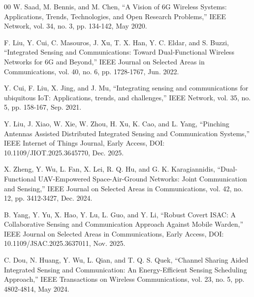 \documentclass[10pt,journal,compsoc]{IEEEtran}
\begin{document}
\begin{thebibliography}{00}
W. Saad, M. Bennis, and M. Chen, ``A Vision of 6G Wireless Systems: Applications, Trends, Technologies, and Open Research Problems,'' IEEE Network, vol. 34, no. 3, pp. 134-142, May 2020.

F. Liu, Y. Cui, C. Masouros, J. Xu, T. X. Han, Y. C. Eldar, and S. Buzzi, ``Integrated Sensing and Communications: Toward Dual-Functional Wireless Networks for 6G and Beyond,'' IEEE Journal on Selected Areas in Communications, vol. 40, no. 6, pp. 1728-1767, Jun. 2022.

Y. Cui, F. Liu, X. Jing, and J. Mu, ``Integrating sensing and communications for ubiquitous IoT: Applications, trends, and challenges,'' IEEE Network, vol. 35, no. 5, pp. 158-167, Sep. 2021.

Y. Liu, J. Xiao, W. Xie, W. Zhou, H. Xu, K. Cao, and L. Yang,
``Pinching Antennas Assisted Distributed Integrated Sensing and Communication Systems,''
IEEE Internet of Things Journal, Early Access, DOI: 10.1109/JIOT.2025.3645770, Dec. 2025.

X. Zheng, Y. Wu, L. Fan, X. Lei, R. Q. Hu, and G. K. Karagiannidis,
``Dual-Functional UAV-Empowered Space-Air-Ground Networks: Joint Communication and Sensing,''
IEEE Journal on Selected Areas in Communications, vol. 42, no. 12, pp. 3412-3427, Dec. 2024.


B. Yang, Y. Yu, X. Hao, Y. Lu, L. Guo, and Y. Li,
``Robust Covert ISAC: A Collaborative Sensing and Communication Approach Against Mobile Warden,''
IEEE Journal on Selected Areas in Communications, Early Access, DOI: 10.1109/JSAC.2025.3637011,  Nov. 2025.

C. Dou, N. Huang, Y. Wu, L. Qian, and T. Q. S. Quek,
``Channel Sharing Aided Integrated Sensing and Communication: An Energy-Efficient Sensing Scheduling Approach,''
IEEE Transactions on Wireless Communications, vol. 23, no. 5, pp. 4802-4814, May 2024.


\end{thebibliography}
\end{document}
